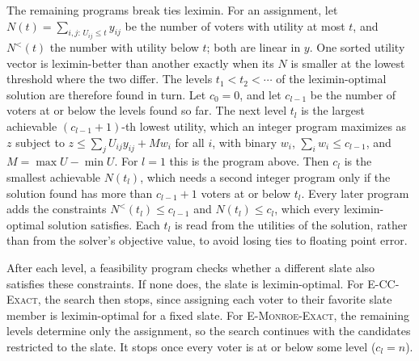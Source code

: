 \documentclass[letterpaper]{article} %
\newcommand{\EExactMonroe}{\textsc{E-Monroe-Exact}}
\newcommand{\ECCExact}{\textsc{E-CC-Exact}}
\begin{document}
The remaining programs break ties leximin.
For an assignment, let \(N(t)=\sum_{i,j:\,U_{ij}\le t} y_{ij}\) be the number of voters with utility at most \(t\), and \(N^<(t)\) the number with utility below \(t\); both are linear in \(y\).
One sorted utility vector is leximin-better than another exactly when its \(N\) is smaller at the lowest threshold where the two differ.
The levels \(t_1<t_2<\cdots\) of the leximin-optimal solution are therefore found in turn.
Let \(c_0=0\), and let \(c_{l-1}\) be the number of voters at or below the levels found so far.
The next level \(t_l\) is the largest achievable \((c_{l-1}+1)\)-th lowest utility, which an integer program maximizes as \(z\) subject to \(z\le\sum_j U_{ij}y_{ij}+M w_i\) for all \(i\), with binary \(w_i\), \(\sum_i w_i\le c_{l-1}\), and \(M=\max U-\min U\).
For \(l=1\) this is the program above.
Then \(c_l\) is the smallest achievable \(N(t_l)\), which needs a second integer program only if the solution found has more than \(c_{l-1}+1\) voters at or below \(t_l\).
Every later program adds the constraints \(N^<(t_l)\le c_{l-1}\) and \(N(t_l)\le c_l\), which every leximin-optimal solution satisfies.
Each \(t_l\) is read from the utilities of the solution, rather than from the solver's objective value, to avoid losing ties to floating point error.

After each level, a feasibility program checks whether a different slate also satisfies these constraints.
If none does, the slate is leximin-optimal.
For \ECCExact{}, the search then stops, since assigning each voter to their favorite slate member is leximin-optimal for a fixed slate.
For \EExactMonroe{}, the remaining levels determine only the assignment, so the search continues with the candidates restricted to the slate.
It stops once every voter is at or below some level (\(c_l=n\)).



\end{document}
